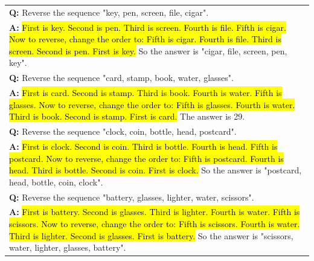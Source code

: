 \begin{table}[H]
\begin{tabular}{p{\linewidth}}
        \vspace{0mm}
        \textbf{Q:} Reverse the sequence "key, pen, screen, file, cigar". \\
        \vspace{-1mm}
        \textbf{A:} \hl{First is key. Second is pen. Third is screen. Fourth is file. Fifth is cigar. Now to reverse, change the order to: Fifth is cigar. Fourth is file. Third is screen. Second is pen. First is key.} So the answer is "cigar, file, screen, pen, key". \\
        \vspace{0mm}
        \textbf{Q:} Reverse the sequence "card, stamp, book, water, glasses". \\
        \vspace{-1mm}
        \textbf{A:} \hl{First is card. Second is stamp. Third is book. Fourth is water. Fifth is glasses. Now to reverse, change the order to: Fifth is glasses. Fourth is water. Third is book. Second is stamp. First is card.} The answer is 29. \\
        \vspace{0mm}
        \textbf{Q:} Reverse the sequence "clock, coin, bottle, head, postcard". \\
        \vspace{-1mm}
        \textbf{A:} \hl{First is clock. Second is coin. Third is bottle. Fourth is head. Fifth is postcard. Now to reverse, change the order to: Fifth is postcard. Fourth is head. Third is bottle. Second is coin. First is clock.} So the answer is "postcard, head, bottle, coin, clock". \\
        \vspace{0mm}
        \textbf{Q:} Reverse the sequence "battery, glasses, lighter, water, scissors". \\
        \vspace{-1mm}
        \textbf{A:} \hl{First is battery. Second is glasses. Third is lighter. Fourth is water. Fifth is scissors. Now to reverse, change the order to: Fifth is scissors. Fourth is water. Third is lighter. Second is glasses. First is battery.} So the answer is "scissors, water, lighter, glasses, battery". \\
        \bottomrule
    \end{tabular}
    \label{tab:appendix-reverse-list-prompt}
\end{table}
\endgroup